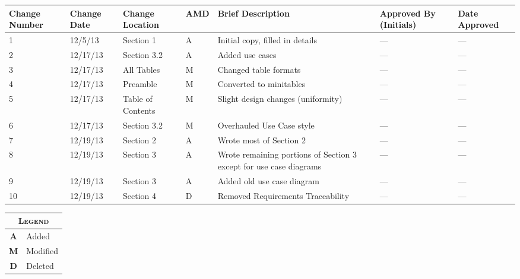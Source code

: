 \documentclass[twoside,letterpaper]{article}
\begin{document}
\begin{minipage}{\linewidth}
\centering
\begin{tabularx}{\textwidth}{XXXXPXX}\toprule[1.5pt] %

\bf Change Number & \bf Change Date & \bf Change Location & \bf A\newline M\newline D & \bf Brief \newline Description & \bf Approved By \newline (Initials) & \bf Date Approved \\ \midrule[1.0pt]

1 & 12/5/13 & Section 1 & A & Initial copy, filled in details & --- & ---\\
2 & 12/17/13 & Section 3.2 & A & Added use cases & --- & ---\\
3 & 12/17/13 & All Tables & M & Changed table formats & --- & ---\\
4 & 12/17/13 & Preamble & M & Converted to minitables & --- & ---\\
5 & 12/17/13 & Table of Contents & M & Slight design changes (uniformity) & --- & ---\\
6 & 12/17/13 & Section 3.2 & M & Overhauled Use Case style & --- & ---\\
7 & 12/19/13 & Section 2 & A & Wrote most of Section 2 & --- & ---\\
8 & 12/19/13 & Section 3 & A & Wrote remaining portions of Section 3 except for use case diagrams & --- & ---\\
9 & 12/19/13 & Section 3 & A & Added old use case diagram & --- & ---\\
10 & 12/19/13 & Section 4 & D & Removed Requirements Traceability & --- & ---\\

\bottomrule[1.5pt]
\end{tabularx}\par

\bigskip
\raggedleft %
\begin{tabular}{c l}
\multicolumn{2}{c}{\textsc{Legend}} \\ \midrule[0.5pt]
\textsc{\textbf{A}}   & Added\\
\textsc{\textbf{M}}   & Modified\\
\textsc{\textbf{D}}	  & Deleted\\
\end{tabular}
\end{minipage}
\end{document}
